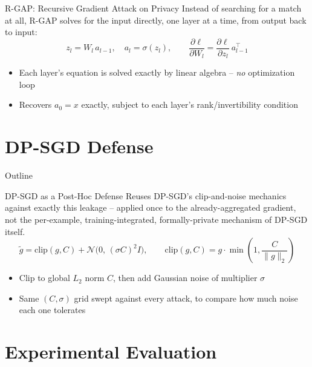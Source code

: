 \documentclass[aspectratio=169,xcolor=dvipsnames]{beamer}
\begin{document}

\begin{frame}{R-GAP: Recursive Gradient Attack on Privacy}
Instead of searching for a match at all, R-GAP solves for the input directly, one
layer at a time, from output back to input:
\[
z_l = W_l \, a_{l-1}, \quad a_l = \sigma(z_l), \qquad
\frac{\partial \ell}{\partial W_l} = \frac{\partial \ell}{\partial z_l} \, a_{l-1}^{\top}
\]
\begin{itemize}
\item Each layer's equation is solved exactly by linear algebra -- \emph{no}
optimization loop
\item Recovers $a_0 = x$ exactly, subject to each layer's rank/invertibility condition
\end{itemize}
\end{frame}


\section{DP-SGD Defense}

\begin{frame}{Outline}
\tableofcontents[currentsection]
\end{frame}


\begin{frame}{DP-SGD as a Post-Hoc Defense}
Reuses DP-SGD's clip-and-noise mechanics against exactly this leakage -- applied once
to the already-aggregated gradient, not the per-example, training-integrated,
formally-private mechanism of DP-SGD itself.
\[
\tilde{g} = \mathrm{clip}(g, C) + \mathcal{N}\!\big(0,\, (\sigma C)^2 I\big),
\qquad
\mathrm{clip}(g, C) = g \cdot \min\!\left(1, \frac{C}{\lVert g \rVert_2}\right)
\]
\begin{itemize}
\item Clip to global $L_2$ norm $C$, then add Gaussian noise of multiplier $\sigma$
\item Same $(C,\sigma)$ grid swept against every attack, to compare how much noise each
one tolerates
\end{itemize}
\end{frame}


\section{Experimental Evaluation}
\end{document}
